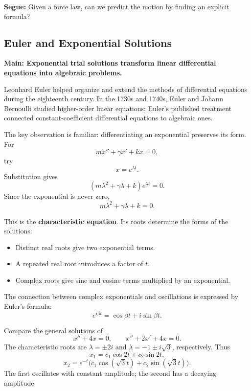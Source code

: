 \documentclass[11pt,letterpaper]{article}
\begin{document}
\textbf{Segue:} Given a force law, can we predict the motion by finding an explicit formula?

\subsection{Euler and Exponential Solutions}
\textbf{Main: Exponential trial solutions transform linear differential equations into algebraic problems. }

Leonhard Euler helped organize and extend the methods
of differential equations during the eighteenth century.
In the 1730s and 1740s, Euler and Johann Bernoulli
studied higher-order linear equations; Euler's published
treatment connected constant-coefficient differential
equations to algebraic ones.


The key observation is familiar:
differentiating an exponential preserves its form.
For
\[
mx''+\gamma x'+kx=0,
\]
try
\[
x=e^{\lambda t}.
\]
Substitution gives
\[
(m\lambda^2+\gamma\lambda+k)e^{\lambda t}=0.
\]
Since the exponential is never zero,
\[
\boxed{m\lambda^2+\gamma\lambda+k=0.}
\]

This is the \textbf{characteristic equation}.
Its roots determine the forms of the solutions:
\begin{itemize}
    \item Distinct real roots give two exponential terms.
    \item A repeated real root introduces a factor of $t$.
    \item Complex roots give sine and cosine terms
    multiplied by an exponential.
\end{itemize}

The connection between complex exponentials and
oscillations is expressed by Euler's formula:
\[
e^{i\beta t}=\cos\beta t+i\sin\beta t.
\]

\begin{example}{
Compare the general solutions of
\[
x''+4x=0,
\qquad
x''+2x'+4x=0.
\]
}
The characteristic roots are $\lambda=\pm2i$
and $\lambda=-1\pm i\sqrt3$, respectively. Thus
\[
x_1=c_1\cos2t+c_2\sin2t,
\]
\[
x_2=e^{-t}\bigl(c_1\cos(\sqrt3 t)
                   +c_2\sin(\sqrt3 t)\bigr).
\]
The first oscillates with constant amplitude;
the second has a decaying amplitude.
\end{example}
\end{document}
